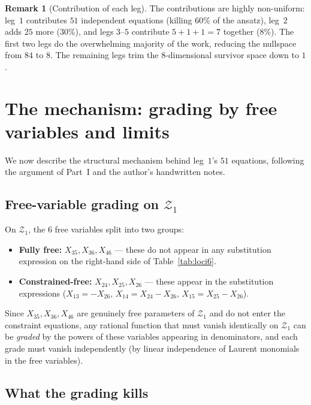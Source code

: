 \documentclass[11pt]{article}
\theoremstyle{plain}
\theoremstyle{definition}
\newtheorem{remark}[theorem]{Remark}
\newcommand{\cZ}{\mathcal{Z}}
\begin{document}
\begin{remark}[Contribution of each leg]
The contributions are highly non-uniform: leg~$1$ contributes $51$ independent
equations (killing $60\%$ of the ansatz), leg~$2$ adds $25$ more ($30\%$), and
legs $3$--$5$ contribute $5 + 1 + 1 = 7$ together ($8\%$). The first two legs
do the overwhelming majority of the work, reducing the nullspace from $84$ to $8$.
The remaining legs trim the $8$-dimensional survivor space down to $1$.
\end{remark}

\section{The mechanism: grading by free variables and limits}

We now describe the structural mechanism behind leg~$1$'s $51$ equations,
following the argument of Part~I and the author's handwritten notes.

\subsection{Free-variable grading on $\cZ_1$}

On $\cZ_1$, the $6$ free variables split into two groups:
\begin{itemize}[nosep]
\item \textbf{Fully free:} $X_{35}, X_{36}, X_{46}$ --- these do not appear in any
      substitution expression on the right-hand side of Table~\ref{tab:loci6}.
\item \textbf{Constrained-free:} $X_{24}, X_{25}, X_{26}$ --- these appear in the
      substitution expressions ($X_{13} = -X_{26}$, $X_{14} = X_{24} - X_{26}$,
      $X_{15} = X_{25} - X_{26}$).
\end{itemize}

Since $X_{35}, X_{36}, X_{46}$ are genuinely free parameters of $\cZ_1$ and do not
enter the constraint equations, any rational function that must vanish identically
on $\cZ_1$ can be \emph{graded} by the powers of these variables appearing in
denominators, and each grade must vanish independently (by linear independence of
Laurent monomials in the free variables).

\subsection{What the grading kills}
\end{document}
